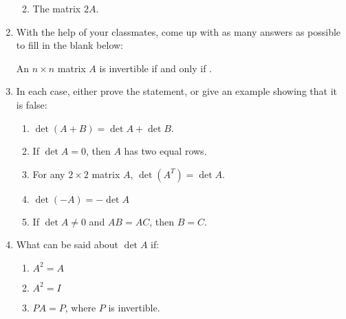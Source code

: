 \documentclass[12pt]{article}
\begin{document}
\begin{enumerate}
\begin{enumerate}
\bigskip

 \item The matrix $2A$.
\end{enumerate}

\bigskip

\item With the help of your classmates, come up with as many answers as possible to fill in the blank below:

\medskip

An $n\times n$ matrix $A$ is invertible if and only if \underline{\hspace{2in}}.

\newpage

\item In each case, either prove the statement, or give an example showing that it is false:
\begin{enumerate}
 \item $\det(A+B)=\det A+\det B$.

\vspace{1in}

 \item If $\det A=0$, then $A$ has two equal rows.

\vspace{1in}

 \item For any $2\times 2$ matrix $A$, $\det (A^T)=\det A$.

\vspace{1in}

 \item $\det (-A) = -\det A$

\vspace{1in}

 \item If $\det A\neq 0$ and $AB=AC$, then $B=C$.


\end{enumerate}

\item What can be said about $\det A$ if:
\begin{enumerate}
 \item $A^2=A$

\vspace{1in}

 \item $A^2 = I$

\vspace{1in}

 \item $PA=P$, where $P$ is invertible.
\end{enumerate}



 \end{enumerate}
\end{document}
